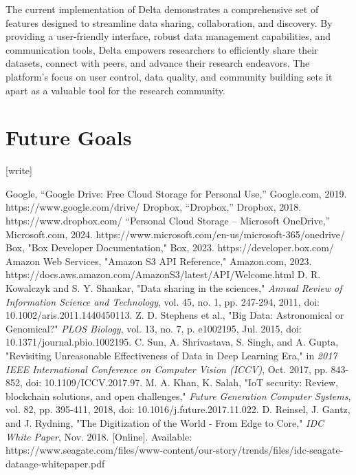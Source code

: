 \documentclass[conference]{IEEEtran}
\begin{document}
The current implementation of Delta demonstrates a comprehensive set of features designed to streamline data sharing, collaboration, and discovery. By providing a user-friendly interface, robust data management capabilities, and communication tools, Delta empowers researchers to efficiently share their datasets, connect with peers, and advance their research endeavors. The platform's focus on user control, data quality, and community building sets it apart as a valuable tool for the research community.

\section{Future Goals}
[write]

\begin{thebibliography}{00}
 Google, “Google Drive: Free Cloud Storage for Personal Use,” Google.com, 2019. https://www.google.com/drive/
 Dropbox, “Dropbox,” Dropbox, 2018. https://www.dropbox.com/
 “Personal Cloud Storage – Microsoft OneDrive,” Microsoft.com, 2024. https://www.microsoft.com/en-us/microsoft-365/onedrive/
 Box, "Box Developer Documentation," Box, 2023. https://developer.box.com/
 Amazon Web Services, "Amazon S3 API Reference," Amazon.com, 2023. https://docs.aws.amazon.com/AmazonS3/latest/API/Welcome.html
 D. R. Kowalczyk and S. Y. Shankar, "Data sharing in the sciences," \textit{Annual Review of Information Science and Technology}, vol. 45, no. 1, pp. 247-294, 2011, doi: 10.1002/aris.2011.1440450113.
 Z. D. Stephens et al., "Big Data: Astronomical or Genomical?" \textit{PLOS Biology}, vol. 13, no. 7, p. e1002195, Jul. 2015, doi: 10.1371/journal.pbio.1002195.
 C. Sun, A. Shrivastava, S. Singh, and A. Gupta, "Revisiting Unreasonable Effectiveness of Data in Deep Learning Era," in \textit{2017 IEEE International Conference on Computer Vision (ICCV)}, Oct. 2017, pp. 843-852, doi: 10.1109/ICCV.2017.97.
 M. A. Khan, K. Salah, "IoT security: Review, blockchain solutions, and open challenges," \textit{Future Generation Computer Systems}, vol. 82, pp. 395-411, 2018, doi: 10.1016/j.future.2017.11.022.
 D. Reinsel, J. Gantz, and J. Rydning, "The Digitization of the World - From Edge to Core," \textit{IDC White Paper}, Nov. 2018. [Online]. Available: https://www.seagate.com/files/www-content/our-story/trends/files/idc-seagate-dataage-whitepaper.pdf

\end{thebibliography}
\end{document}
